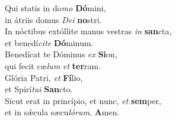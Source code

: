 \evenverse Qui statis in do\textit{mo} \textbf{Dó}mini,~\*\\
\evenverse in átriis domus \textit{De}\textit{i} \textbf{no}stri.\\
\oddverse In nóctibus extóllite manus vestras \textit{in} \textbf{san}cta,~\*\\
\oddverse et benedí\textit{ci}\textit{te} \textbf{Dó}minum.\\
\evenverse Benedícat te Dóminus \textit{ex} \textbf{Si}on,~\*\\
\evenverse qui fecit cæ\textit{lum} \textit{et} \textbf{ter}ram.\\
\oddverse Glória Patri, \textit{et} \textbf{Fí}lio,~\*\\
\oddverse et Spirí\textit{tu}\textit{i} \textbf{San}cto.\\
\evenverse Sicut erat in princípio, et nunc, \textit{et} \textbf{sem}per,~\*\\
\evenverse et in sǽcula sæcu\textit{ló}\textit{rum}. \textbf{A}men.\\
